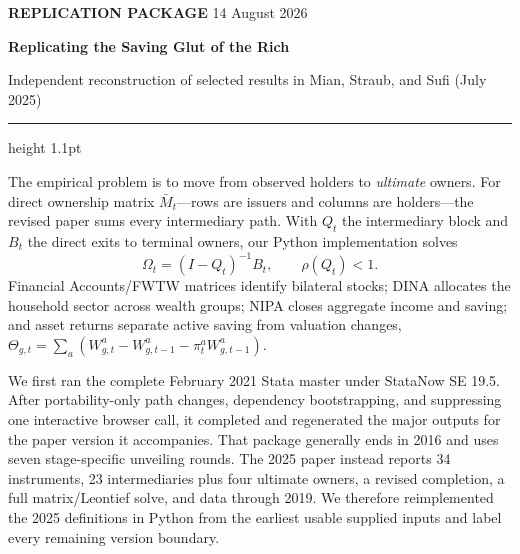 {\color{MSSOrange}\bfseries\small REPLICATION PACKAGE}\hfill
{\color{MSSGray}\small 14 August 2026}\par
{\color{MSSNavy}\bfseries\LARGE Replicating the Saving Glut of the Rich}\par
{\color{MSSGray}\small Independent reconstruction of selected results in Mian, Straub, and Sufi (July 2025)}
\vspace{0.25em}\hrule height 1.1pt\vspace{0.35em}


The empirical problem is to move from observed holders to \emph{ultimate}
owners. For direct ownership matrix $\bar M_t$---rows are issuers and columns
are holders---the revised paper sums every intermediary path. With $Q_t$ the
intermediary block and $B_t$ the direct exits to terminal owners, our Python
implementation solves
\[
  \Omega_t=(I-Q_t)^{-1}B_t, \qquad \rho(Q_t)<1.
\]
Financial Accounts/FWTW matrices identify bilateral stocks; DINA allocates the
household sector across wealth groups; NIPA closes aggregate income and saving;
and asset returns separate active saving from valuation changes,
$\Theta_{g,t}=\sum_a(W^a_{g,t}-W^a_{g,t-1}-\pi^a_tW^a_{g,t-1})$.

We first ran the complete February 2021 Stata master under StataNow SE 19.5.
After portability-only path changes, dependency bootstrapping, and suppressing
one interactive browser call, it completed and regenerated the major outputs
for the paper version it accompanies. That package generally ends in 2016 and
uses seven stage-specific unveiling rounds. The 2025 paper instead reports 34
instruments, 23 intermediaries plus four ultimate owners, a revised completion,
a full matrix/Leontief solve, and data through 2019. We therefore reimplemented
the 2025 definitions in Python from the earliest usable supplied inputs and
label every remaining version boundary.


